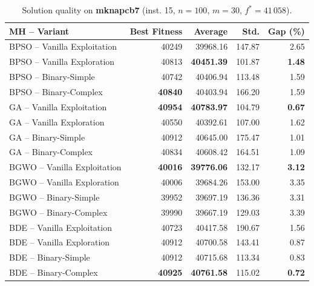 \documentclass[journal,article,submit,moreauthors]{Definitions/mdpi}
\begin{document}
\begin{table}[htbp]
  \centering
  \small
  \caption{Solution quality on \textbf{mknapcb7} (inst. 15, $n=100$, $m=30$, $f^*=41\,058$).}
  \label{tab:calidad_mknapcb7_15}
  \begin{tabular}{lrrrr}
    \toprule
    \textbf{MH -- Variant} &
    \textbf{Best Fitness} &
    \textbf{Average} &
    \textbf{Std.} &
    \textbf{Gap (\%)} \\
    \midrule
    BPSO -- Vanilla Exploitation &          40249 &         39968.16 & 147.87 &         2.65 \\
    BPSO -- Vanilla Exploration  &          40813 & \textbf{40451.39} & 101.87 & \textbf{1.48} \\
    BPSO -- Binary-Simple        &          40742 &         40406.94 & 113.48 &         1.59 \\
    BPSO -- Binary-Complex       & \textbf{40840} &         40403.94 & 166.20 &         1.59 \\
    \midrule
    GA -- Vanilla Exploitation   & \textbf{40954} & \textbf{40783.97} & 104.79 & \textbf{0.67} \\
    GA -- Vanilla Exploration    &          40550 &         40392.61 & 107.00 &         1.62 \\
    GA -- Binary-Simple          &          40912 &         40645.00 & 175.47 &         1.01 \\
    GA -- Binary-Complex         &          40834 &         40608.42 & 164.51 &         1.09 \\
    \midrule
    BGWO -- Vanilla Exploitation & \textbf{40016} & \textbf{39776.06} & 132.17 & \textbf{3.12} \\
    BGWO -- Vanilla Exploration  &          40006 &         39684.26 & 153.00 &         3.35 \\
    BGWO -- Binary-Simple        &          39952 &         39697.19 & 136.36 &         3.31 \\
    BGWO -- Binary-Complex       &          39990 &         39667.19 & 129.03 &         3.39 \\
    \midrule
    BDE -- Vanilla Exploitation  &          40723 &         40417.58 & 190.67 &         1.56 \\
    BDE -- Vanilla Exploration   &          40912 &         40700.58 & 143.41 &         0.87 \\
    BDE -- Binary-Simple         &          40912 &         40715.68 & 113.34 &         0.83 \\
    BDE -- Binary-Complex        & \textbf{40925} & \textbf{40761.58} & 115.02 & \textbf{0.72} \\
    \bottomrule
  \end{tabular}
\end{table}
\end{document}

